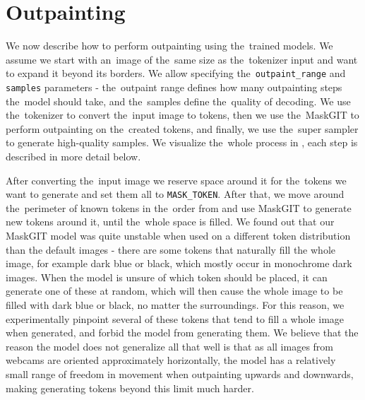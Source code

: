 \chapter{Outpainting} \label{outpainting}


We now describe how to perform outpainting using the~trained models. We assume we start with an~image of the~same size as the~tokenizer input and want to expand it beyond its borders. We allow specifying the~\texttt{outpaint\_range} and \texttt{samples} parameters - the~outpaint range defines how many outpainting steps the~model should take, and the~samples define the~quality of decoding. We use the~tokenizer to convert the~input image to tokens, then we use the~MaskGIT to perform outpainting on the~created tokens, and finally, we use the~super sampler to generate high-quality samples. We visualize the~whole process in , each step is described in more detail below.



After converting the~input image we reserve space around it for the~tokens we want to generate and set them all to \texttt{MASK\_TOKEN}. After that, we move around the~perimeter of known tokens in the~order from  and use MaskGIT to generate new tokens around it, until the~whole space is filled. We found out that our MaskGIT model was quite unstable when used on a different token distribution than the default images - there are some tokens that naturally fill the whole image, for example dark blue or black, which mostly occur in monochrome dark images. When the model is unsure of which token should be placed, it can generate one of these at random, which will then cause the whole image to be filled with dark blue or black, no matter the surroundings. For this reason, we experimentally pinpoint several of these tokens that tend to fill a whole image when generated, and forbid the model from generating them. We believe that the reason the model does not generalize all that well is that as all images from webcams are oriented approximately horizontally, the model has a relatively small range of freedom in movement when outpainting upwards and downwards, making generating tokens beyond this limit much harder.



